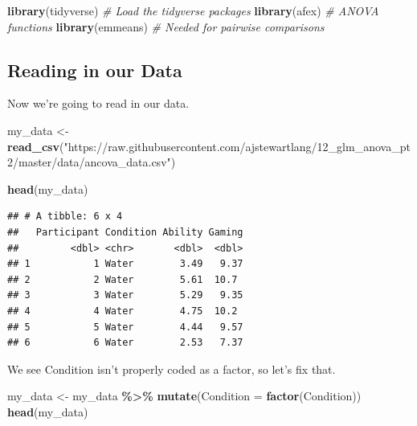 \documentclass[
]{book}
\newenvironment{Shaded}{\begin{snugshade}}{\end{snugshade}}
\newcommand{\AttributeTok}[1]{\textcolor[rgb]{0.13,0.29,0.53}{#1}}
\newcommand{\CommentTok}[1]{\textcolor[rgb]{0.56,0.35,0.01}{\textit{#1}}}
\newcommand{\FunctionTok}[1]{\textcolor[rgb]{0.13,0.29,0.53}{\textbf{#1}}}
\newcommand{\NormalTok}[1]{#1}
\newcommand{\OtherTok}[1]{\textcolor[rgb]{0.56,0.35,0.01}{#1}}
\newcommand{\SpecialCharTok}[1]{\textcolor[rgb]{0.81,0.36,0.00}{\textbf{#1}}}
\newcommand{\StringTok}[1]{\textcolor[rgb]{0.31,0.60,0.02}{#1}}
\begin{document}
\begin{Shaded}
\begin{Highlighting}[]
\FunctionTok{library}\NormalTok{(tidyverse) }\CommentTok{\# Load the tidyverse packages}
\FunctionTok{library}\NormalTok{(afex) }\CommentTok{\# ANOVA functions}
\FunctionTok{library}\NormalTok{(emmeans) }\CommentTok{\# Needed for pairwise comparisons}
\end{Highlighting}
\end{Shaded}

\hypertarget{reading-in-our-data-3}{%
\subsection{Reading in our Data}\label{reading-in-our-data-3}}

Now we're going to read in our data.

\begin{Shaded}
\begin{Highlighting}[]
\NormalTok{my\_data }\OtherTok{\textless{}{-}} \FunctionTok{read\_csv}\NormalTok{(}\StringTok{"https://raw.githubusercontent.com/ajstewartlang/12\_glm\_anova\_pt2/master/data/ancova\_data.csv"}\NormalTok{)}
\end{Highlighting}
\end{Shaded}

\begin{Shaded}
\begin{Highlighting}[]
\FunctionTok{head}\NormalTok{(my\_data)}
\end{Highlighting}
\end{Shaded}

\begin{verbatim}
## # A tibble: 6 x 4
##   Participant Condition Ability Gaming
##         <dbl> <chr>       <dbl>  <dbl>
## 1           1 Water        3.49   9.37
## 2           2 Water        5.61  10.7 
## 3           3 Water        5.29   9.35
## 4           4 Water        4.75  10.2 
## 5           5 Water        4.44   9.57
## 6           6 Water        2.53   7.37
\end{verbatim}

We see Condition isn't properly coded as a factor, so let's fix that.

\begin{Shaded}
\begin{Highlighting}[]
\NormalTok{my\_data }\OtherTok{\textless{}{-}}\NormalTok{ my\_data }\SpecialCharTok{\%\textgreater{}\%} 
  \FunctionTok{mutate}\NormalTok{(}\AttributeTok{Condition =} \FunctionTok{factor}\NormalTok{(Condition))}
\FunctionTok{head}\NormalTok{(my\_data)}
\end{Highlighting}
\end{Shaded}
\end{document}
